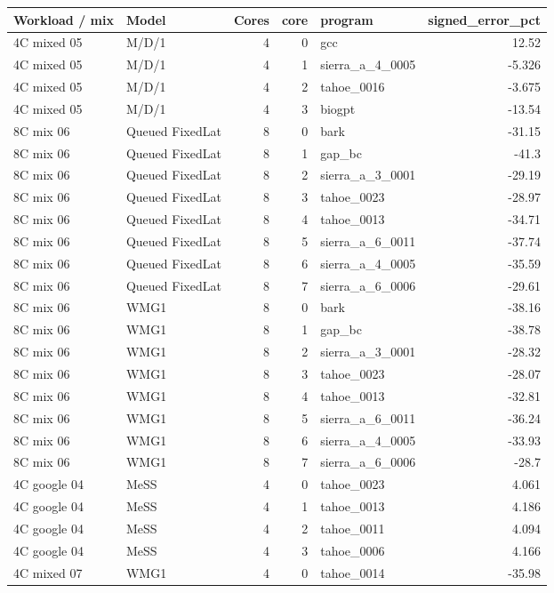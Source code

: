 \begin{tabular}{llrrlr}
\toprule
Workload / mix & Model & Cores & core & program & signed\_error\_pct \\
\midrule
4C mixed 05 & M/D/1 & 4 & 0 & gcc & 12.52 \\
4C mixed 05 & M/D/1 & 4 & 1 & sierra\_a\_4\_0005 & -5.326 \\
4C mixed 05 & M/D/1 & 4 & 2 & tahoe\_0016 & -3.675 \\
4C mixed 05 & M/D/1 & 4 & 3 & biogpt & -13.54 \\
8C mix 06 & Queued FixedLat & 8 & 0 & bark & -31.15 \\
8C mix 06 & Queued FixedLat & 8 & 1 & gap\_bc & -41.3 \\
8C mix 06 & Queued FixedLat & 8 & 2 & sierra\_a\_3\_0001 & -29.19 \\
8C mix 06 & Queued FixedLat & 8 & 3 & tahoe\_0023 & -28.97 \\
8C mix 06 & Queued FixedLat & 8 & 4 & tahoe\_0013 & -34.71 \\
8C mix 06 & Queued FixedLat & 8 & 5 & sierra\_a\_6\_0011 & -37.74 \\
8C mix 06 & Queued FixedLat & 8 & 6 & sierra\_a\_4\_0005 & -35.59 \\
8C mix 06 & Queued FixedLat & 8 & 7 & sierra\_a\_6\_0006 & -29.61 \\
8C mix 06 & WMG1 & 8 & 0 & bark & -38.16 \\
8C mix 06 & WMG1 & 8 & 1 & gap\_bc & -38.78 \\
8C mix 06 & WMG1 & 8 & 2 & sierra\_a\_3\_0001 & -28.32 \\
8C mix 06 & WMG1 & 8 & 3 & tahoe\_0023 & -28.07 \\
8C mix 06 & WMG1 & 8 & 4 & tahoe\_0013 & -32.81 \\
8C mix 06 & WMG1 & 8 & 5 & sierra\_a\_6\_0011 & -36.24 \\
8C mix 06 & WMG1 & 8 & 6 & sierra\_a\_4\_0005 & -33.93 \\
8C mix 06 & WMG1 & 8 & 7 & sierra\_a\_6\_0006 & -28.7 \\
4C google 04 & MeSS & 4 & 0 & tahoe\_0023 & 4.061 \\
4C google 04 & MeSS & 4 & 1 & tahoe\_0013 & 4.186 \\
4C google 04 & MeSS & 4 & 2 & tahoe\_0011 & 4.094 \\
4C google 04 & MeSS & 4 & 3 & tahoe\_0006 & 4.166 \\
4C mixed 07 & WMG1 & 4 & 0 & tahoe\_0014 & -35.98 \\

\end{tabular}
